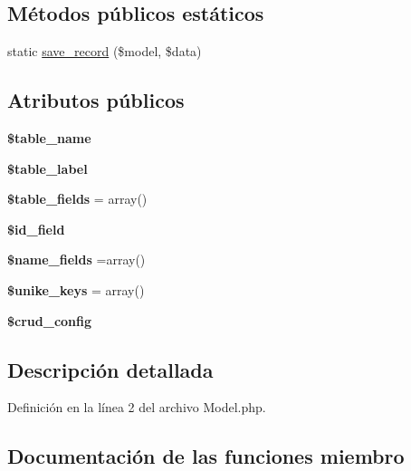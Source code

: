 \subsection*{Métodos públicos estáticos}
\begin{DoxyCompactItemize}
\item 
static \mbox{\hyperlink{class_model_a740d72b25fc3721184b8e304ab1d5c50}{save\+\_\+record}} (\$model, \$data)
\end{DoxyCompactItemize}
\subsection*{Atributos públicos}
\begin{DoxyCompactItemize}
\item 
\mbox{\label{class_model_a62f67587e29b2aa93736f38c97c56c65}} 
{\bfseries \$table\+\_\+name}
\item 
\mbox{\label{class_model_ace211b9f546fe7d6bc2ea14cbcfbedce}} 
{\bfseries \$table\+\_\+label}
\item 
\mbox{\label{class_model_aae5dcd1ecd7548a6a494a6807e28cc07}} 
{\bfseries \$table\+\_\+fields} = array()
\item 
\mbox{\label{class_model_a3d6b4d251b99d01427ce9f9d9e7cbbb3}} 
{\bfseries \$id\+\_\+field}
\item 
\mbox{\label{class_model_aac464bb0d649295a3b89456954116001}} 
{\bfseries \$name\+\_\+fields} =array()
\item 
\mbox{\label{class_model_a4758f4b279f7fcb936bc191235f0d269}} 
{\bfseries \$unike\+\_\+keys} = array()
\item 
{\bfseries \$crud\+\_\+config}
\end{DoxyCompactItemize}


\subsection{Descripción detallada}


Definición en la línea 2 del archivo Model.\+php.



\subsection{Documentación de las funciones miembro}
\mbox{\label{class_model_ab85f7264cd89a8180cacda746a089e9e}} 
